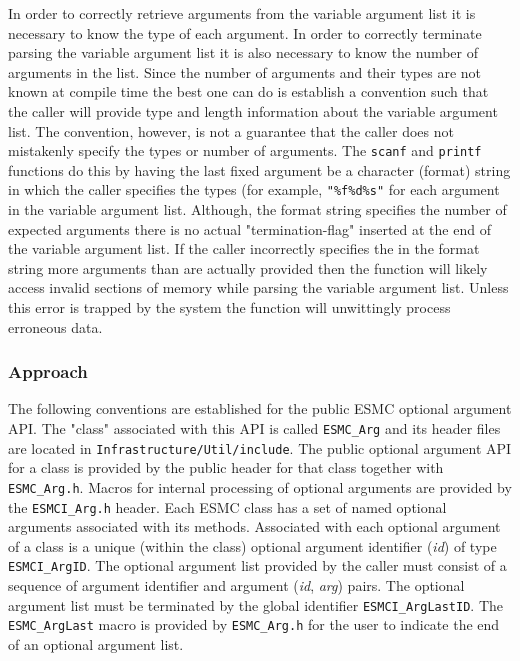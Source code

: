 In order to correctly retrieve arguments from the variable argument list it is
necessary to know the type of each argument. In order to correctly terminate
parsing the variable argument list it is also necessary to know the number of
arguments in the list. Since the number of arguments and their types
are not known at compile time the best one can do is establish a convention
such that the caller will provide type and length information about the variable
argument list. The convention, however, is not a guarantee that the caller does
not mistakenly specify the types or number of arguments.
The \texttt{scanf} and \texttt{printf} functions do this by having
the last fixed argument be a character (format) string in which the caller
specifies the types (for example, \texttt{"\%f\%d\%s"} for each argument in the
variable argument list. Although, the format string specifies the number of
expected arguments there is no actual "termination-flag" inserted at the end of
the variable argument list. If the caller incorrectly specifies the in the format
string more arguments than are actually provided then the function will likely
access invalid sections of memory while parsing the variable argument list.
Unless this error is trapped by the system the function will unwittingly process
erroneous data.


\subsubsection{Approach}

The following conventions are established for the public ESMC optional argument
API. The "class" associated with this API is called \texttt{ESMC\_Arg} and its
header files are located in \texttt{Infrastructure/Util/include}. The public
optional argument API for a class is provided by the public header for that class
together with \texttt{ESMC\_Arg.h}. Macros for internal processing of optional
arguments are provided by the \texttt{ESMCI\_Arg.h} header.
Each ESMC class has a set of named optional arguments associated with its
methods. Associated with each optional argument of a class is a unique (within
the class) optional argument identifier (\textit{id}) of type
\texttt{ESMCI\_ArgID}. The optional argument list provided by
the caller must consist of a sequence of argument identifier and argument
(\textit{id}, \textit{arg}) pairs. The optional argument list must be terminated
by the global identifier \texttt{ESMCI\_ArgLastID}.
The \texttt{ESMC\_ArgLast} macro is provided by \texttt{ESMC\_Arg.h} for the
user to indicate the end of an optional argument list.
\newline

